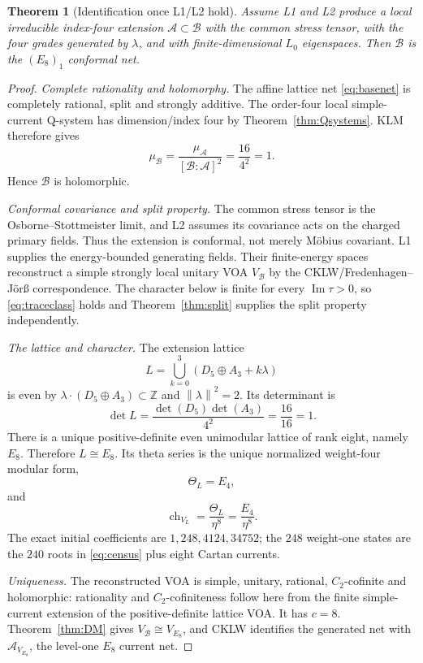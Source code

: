 \documentclass[11pt]{article}
\newtheorem{theorem}{Theorem}[section]
\theoremstyle{remark}
\newcommand{\A}{\mathcal A}
\newcommand{\B}{\mathcal B}
\newcommand{\Z}{\mathbb Z}
\newcommand{\norm}[1]{\left\lVert#1\right\rVert}
\begin{document}
\begin{theorem}[Identification once L1/L2 hold]\label{thm:identification}
Assume L1 and L2 produce a local irreducible index-four extension
$\A\subset\B$ with the common stress tensor, with the four grades
generated by $\lambda$, and with finite-dimensional $L_0$ eigenspaces.
Then $\B$ is the $(E_8)_1$ conformal net.
\end{theorem}

\begin{proof}
\emph{Complete rationality and holomorphy.}
The affine lattice net \eqref{eq:basenet} is completely rational, split
and strongly additive.  The order-four local simple-current Q-system has
dimension/index four by Theorem~\ref{thm:Qsystems}.  KLM therefore gives
\[
 \mu_\B=\frac{\mu_\A}{[\B:\A]^2}
 =\frac{16}{4^2}=1.
\tag{7.4}\label{eq:muone}
\]
Hence $\B$ is holomorphic.

\emph{Conformal covariance and split property.}
The common stress tensor is the Osborne--Stottmeister limit, and L2
assumes its covariance acts on the charged primary fields.  Thus the
extension is conformal, not merely M\"obius covariant.  L1 supplies the
energy-bounded generating fields.  Their finite-energy spaces reconstruct
a simple strongly local unitary VOA $V_\B$ by the CKLW/Fredenhagen--J\"or{\ss}
correspondence.  The character below is finite for every
$\operatorname{Im}\tau>0$, so \eqref{eq:traceclass} holds and
Theorem~\ref{thm:split} supplies the split property independently.

\emph{The lattice and character.}
The extension lattice
\[
 L=\bigcup_{k=0}^3(D_5\oplus A_3+k\lambda)
\tag{7.5}\label{eq:gluedlattice}
\]
is even by $\lambda\cdot(D_5\oplus A_3)\subset\Z$ and
$\norm{\lambda}^2=2$.  Its determinant is
\[
 \det L=\frac{\det(D_5)\det(A_3)}{4^2}
 =\frac{16}{16}=1.
\tag{7.6}\label{eq:unimodular}
\]
There is a unique positive-definite even unimodular lattice of rank
eight, namely $E_8$.  Therefore $L\cong E_8$.
Its theta series is the unique normalized weight-four modular form,
\[
 \Theta_L=E_4,
\tag{7.7}\label{eq:thetaE4}
\]
and
\[
 \operatorname{ch}_{V_L}
 =\frac{\Theta_L}{\eta^8}
 =\frac{E_4}{\eta^8}.
\tag{7.8}\label{eq:character}
\]
The exact initial coefficients are
$1,248,4124,34752$; the $248$ weight-one states are the $240$ roots in
\eqref{eq:census} plus eight Cartan currents.

\emph{Uniqueness.}
The reconstructed VOA is simple, unitary, rational, $C_2$-cofinite and
holomorphic: rationality and $C_2$-cofiniteness follow here from the
finite simple-current extension of the positive-definite lattice VOA.
It has $c=8$.  Theorem~\ref{thm:DM} gives
$V_\B\cong V_{E_8}$, and CKLW identifies the generated net with
$\A_{V_{E_8}}$, the level-one $E_8$ current net.
\end{proof}
\end{document}
